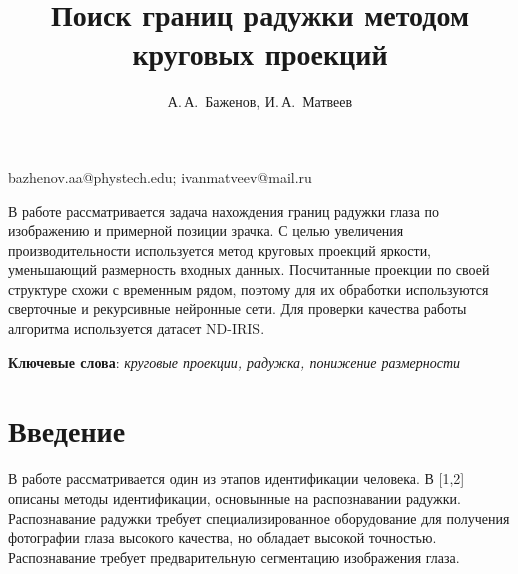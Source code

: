 \documentclass[12pt, twoside]{article}
\begin{document}
\title
    {Поиск границ радужки методом круговых проекций} %
\author
    {А.\,А.~Баженов, И.\,А.~Матвеев} %
\email
    {bazhenov.aa@phystech.edu; ivanmatveev@mail.ru}
\abstract
    {В работе рассматривается задача нахождения границ радужки глаза по  изображению и примерной позиции зрачка. С целью увеличения производительности используется метод круговых проекций яркости, уменьшающий размерность входных данных. Посчитанные проекции по своей структуре схожи с временным рядом, поэтому для их обработки используются сверточные и рекурсивные нейронные сети. Для проверки качества работы алгоритма используется датасет ND-IRIS.
	
\bigskip
\noindent
\textbf{Ключевые слова}: \emph {круговые проекции, радужка, понижение размерности}

}


\maketitle
\linenumbers

\section{Введение}
В работе рассматривается один из этапов идентификации человека. В [1,2] описаны методы идентификации, основынные на распознавании радужки. Распознавание радужки требует специализированное оборудование для получения фотографии глаза высокого качества, но обладает высокой точностью. Распознавание требует предварительную сегментацию изображения глаза.
\end{document}
